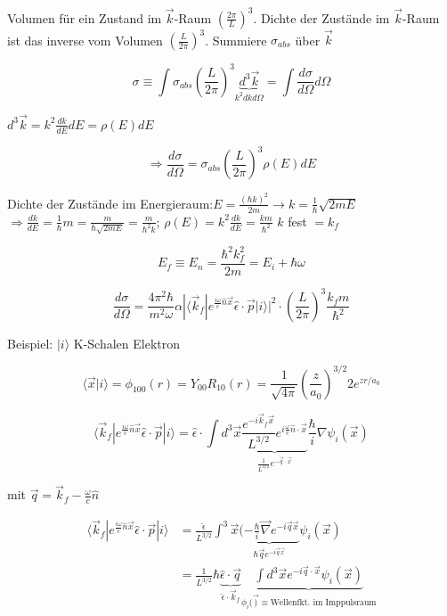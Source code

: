 Volumen für ein Zustand im \(\vec k\)-Raum \(\left( \frac{2\pi}{L}\right)^3\). Dichte der Zustände im \(\vec k\)-Raum ist das inverse vom Volumen \(\left( \frac{L}{2\pi}\right)^3\). Summiere \(\sigma_{abs}\) über \(\vec k\)

\[\sigma \equiv \int \sigma_{abs} \left( \frac{L}{2\pi}\right)^3 \underbrace{d^3\vec k}_{k^2 dkd\Omega} = \int \frac{d\sigma}{d\Omega}d\Omega\]

\(d^3\vec k = k^2\frac{dk}{dE}dE = \rho(E)dE\)

\[\Rightarrow \frac{d\sigma}{d\Omega} = \sigma_{abs} \left( \frac{L}{2\pi}\right)^3\rho(E)dE\]

Dichte der Zustände im Energieraum:\(E=\frac{(\hbar k)^2}{2m} \rightarrow k=\frac{1}{\hbar}\sqrt{2mE}\) \(\Rightarrow \frac{dk}{dE} = \frac{1}{\hbar}m=\frac{m}{\hbar \sqrt{2mE}}=\frac{m}{\hbar^2k}\); \(\rho(E) = k^2 \frac{dk}{dE} = \frac{km}{\hbar^2}\) \(k\) fest \(=k_f\)

\[E_f\equiv E_n = \frac{\hbar^2k_f^2}{2m} = E_i +\hbar\omega\]

\[\frac{d\sigma}{d\Omega} = \frac{4\pi^2\hbar}{m^2\omega}\alpha  |\langle \vec k_f|e^{\frac{i\omega}{c}\hat n\vec x}\hat \epsilon\cdot\vec p|i\rangle|^2\cdot \left( \frac{L}{2\pi}\right)^3 \frac{k_f m}{\hbar^2}\]

Beispiel: \(|i\rangle\) K-Schalen Elektron

\[\langle \vec x|i\rangle =\phi_{100}(r) = Y_{00}R_{10}(r) = \frac{1}{\sqrt{4\pi}}\left( \frac{z}{a_0} \right)^{3/2} 2 e^{zr/a_0}\]



\[\langle \vec k_f|e^{\frac{i\omega}{c}\hat n\vec x}\hat \epsilon\cdot\vec p|i\rangle = \hat\epsilon\cdot\int d^3\vec x \underbrace{\frac{e^{-i\vec k_f\vec x}}{L^{3/2}}e^{i\frac{\omega}{c}\hat n\cdot\vec x}}_{\frac{1}{L^{3/2}}e^{-\vec q\cdot \vec x}}\frac{\hbar}{i}\nabla \psi_i(\vec x)\]

mit \(\boxed{\vec q = \vec k_f -\frac{\omega}{c}\hat n}\)

\begin{align}
  \langle \vec k_f|e^{\frac{i\omega}{c}\hat n\vec x}\hat \epsilon\cdot\vec p|i\rangle &= \frac{\hat \epsilon}{L^{3/2}} \int^3\vec x \underbrace{(-\frac{\hbar}{i}\vec\nabla e^{-i\vec q \vec x}}_{\hbar \vec q e^{-i\vec q\vec x}}\psi_i(\vec x)\\
  &=\frac{1}{L^{3/2}}\hbar \underbrace{\hat\epsilon\cdot\vec q}_{\hat \epsilon\cdot \vec k_f}\underbrace{\int d^3\vec x e^{-i\vec q\cdot\vec x}\psi_i(\vec x)}_{\phi_i(\vec )\equiv\text{Wellenfkt. im Imppulsraum}}
\end{align}



